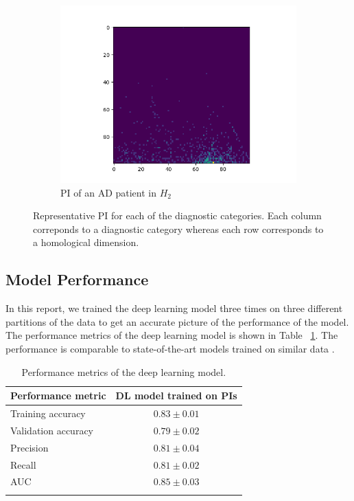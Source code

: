 \documentclass{article}
\begin{document}
\begin{figure}
\begin{subfigure}{0.32\textwidth}
    \includegraphics[width=\textwidth]{figures/PIs/Persistence_image_AD_h_2.png}
    \caption{PI of an AD patient in $H_2$}
  \end{subfigure}
  \caption{Representative PI for each of the diagnostic categories. Each column correponds to a diagnostic category whereas each row corresponds to a homological dimension.}
  \label{fig:sample_rep_pi}
\end{figure}

\subsection{Model Performance}

In this report, we trained the deep learning model three times on three different partitions of the data to get an accurate picture of the performance of the model. The performance metrics of the deep learning model is shown in Table ~\ref{tab:performance}. The performance is comparable to state-of-the-art models trained on similar data \citep{wen2020convolutional}.

\begin{table}
  \centering
  \begin{tabular}{lc}
    \toprule
    \textbf{Performance metric} & \textbf{DL model trained on PIs}\\
    \midrule
    Training accuracy & $0.83 \pm 0.01$  \\
    Validation accuracy & $0.79\pm 0.02$  \\
    Precision & $0.81\pm 0.04$  \\
    Recall & $0.81\pm 0.02$  \\
    AUC & $0.85\pm 0.03$  \\
    \bottomrule
    \vspace{1pt}
  \end{tabular}
  \caption{Performance metrics of the deep learning model.}
  \label{tab:performance}
\end{table}
\end{document}
